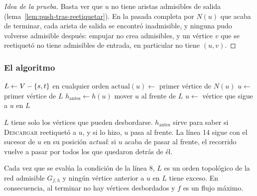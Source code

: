 \documentclass[11pt,letterpaper]{article}
\begin{document}
\begin{proof}[Idea de la prueba]
  Basta ver que $u$ no tiene aristas admisibles de salida
  (lema~\ref{lem:push-tras-reetiquetar}). En la pasada completa por
  $N(u)$ que acaba de terminar, cada arista de salida se encontró
  inadmisible, y ninguna pudo volverse admisible después: empujar no
  crea admisibles, y un vértice $v$ que se reetiquetó no tiene
  admisibles de entrada, en particular no tiene $(u, v)$.
\end{proof}

\subsubsection*{El algoritmo}

\begin{algorithm}[H]
\caption{\textsc{Reetiquetar-al-Frente}$(G, s, t)$
         \ (\textsc{Relabel-To-Front} en Cormen)}
\label{alg:reetiquetar-al-frente}
\begin{algorithmic}[1]
  \State {}
  \State $L \gets V - \left\{ s, t \right\}$ en cualquier orden
    \State $\text{actual}(u) \gets$ primer vértice de $N(u)$
  \EndFor
  \State $u \gets$ primer vértice de $L$
    \State $h_{\text{antes}} \gets h(u)$
    \State {}
     
      \State mover $u$ al frente de $L$
    \EndIf
    \State $u \gets$ vértice que sigue a $u$ en $L$
  \EndWhile
\EndProcedure
\end{algorithmic}
\end{algorithm}

$L$ tiene solo los vértices que pueden desbordarse. $h_{\text{antes}}$
sirve para saber si \textsc{Descargar} reetiquetó a $u$, y si lo hizo,
$u$ pasa al frente. La línea 14 sigue con el sucesor de $u$ en su
posición \emph{actual}: si $u$ acaba de pasar al frente, el recorrido
vuelve a pasar por todos los que quedaron detrás de él.

\begin{teorema}
  \label{teo:reetiquetar-frente}
  Cada vez que se evalúa la condición de la línea 8, $L$ es un orden
  topológico de la red admisible $G_{f,h}$ y ningún vértice anterior a
  $u$ en $L$ tiene exceso. En consecuencia, al terminar no hay
  vértices desbordados y $f$ es un flujo máximo.
\end{teorema}
\end{document}
